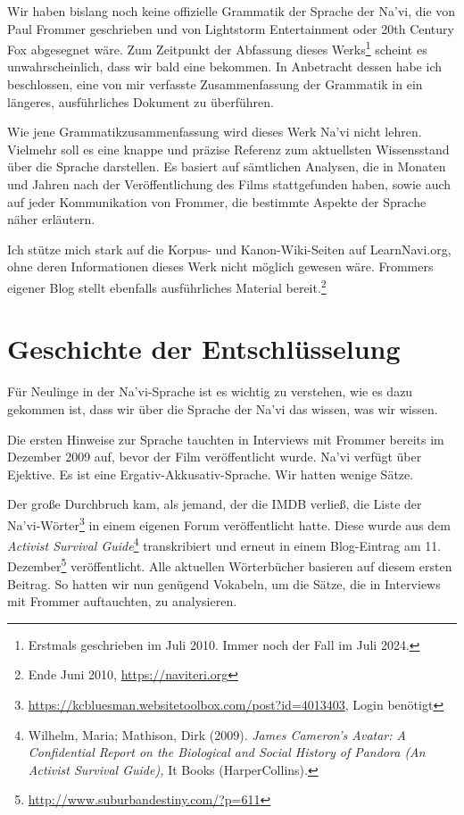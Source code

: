 
Wir haben bislang noch keine offizielle Grammatik der Sprache der Na'vi, die von Paul Frommer geschrieben und von Lightstorm Entertainment oder 20th Century Fox abgesegnet wäre. Zum Zeitpunkt der Abfassung dieses Werks\footnote{Erstmals geschrieben im Juli 2010. Immer noch der Fall im Juli 2024.} scheint es unwahrscheinlich, dass wir bald eine bekommen. In Anbetracht dessen habe ich beschlossen, eine von mir verfasste Zusammenfassung der Grammatik in ein längeres, ausführliches Dokument zu überführen.

Wie jene Grammatikzusammenfassung wird dieses Werk Na'vi nicht lehren. Vielmehr soll es eine knappe und präzise Referenz zum aktuellsten Wissensstand über die Sprache darstellen. Es basiert auf sämtlichen Analysen, die in Monaten und Jahren nach der Veröffentlichung des Films stattgefunden haben, sowie auch auf jeder Kommunikation von Frommer, die bestimmte Aspekte der Sprache näher erläutern.

Ich stütze mich stark auf die Korpus- und Kanon-Wiki-Seiten auf LearnNavi.org, ohne deren Informationen dieses Werk nicht möglich gewesen wäre. Frommers eigener Blog stellt ebenfalls ausführliches Material bereit.\footnote{Ende Juni 2010, \url{https://naviteri.org}}

\section{Geschichte der Entschlüsselung}

Für Neulinge in der Na'vi-Sprache ist es wichtig zu verstehen, wie es dazu gekommen ist, dass wir über die Sprache der Na'vi das wissen, was wir wissen.

Die ersten Hinweise zur Sprache tauchten in Interviews mit Frommer bereits im Dezember 2009 auf, bevor der Film veröffentlicht wurde. Na'vi verfügt über Ejektive. Es ist eine Ergativ-Akkusativ-Sprache. Wir hatten wenige Sätze.

Der große Durchbruch kam, als jemand, der die IMDB verließ, die Liste der Na'vi-Wörter\footnote{\url{https://kcbluesman.websitetoolbox.com/post?id=4013403}, Login benötigt} in einem eigenen Forum veröffentlicht hatte. Diese wurde aus dem \textit{Activist Survival Guide}\footnote{Wilhelm, Maria; Mathison, Dirk (2009). \textit{James Cameron's Avatar: A Confidential Report on the Biological and Social History of Pandora (An Activist Survival Guide),} It Books (HarperCollins).} transkribiert und erneut in einem Blog-Eintrag am 11. Dezember\footnote{\url{http://www.suburbandestiny.com/?p=611}} veröffentlicht. Alle aktuellen Wörterbücher basieren auf diesem ersten Beitrag. So hatten wir nun genügend Vokabeln, um die Sätze, die in Interviews mit Frommer auftauchten, zu analysieren.

